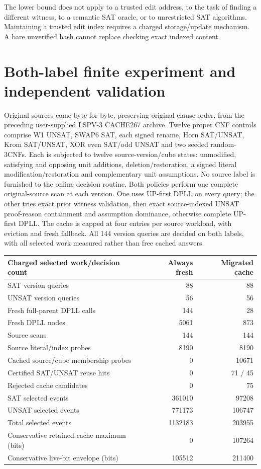 \documentclass[11pt]{article}
\begin{document}
\noindent The lower bound does not apply to a trusted edit address, to the task of finding a different witness, to a semantic SAT oracle, or to unrestricted SAT algorithms. Maintaining a trusted edit index requires a charged storage/update mechanism. A bare unverified hash cannot replace checking exact indexed content.

\section{Both-label finite experiment and independent validation}
Original sources come byte-for-byte, preserving original clause order, from the preceding user-supplied LSPV-3 CACHE267 archive. Twelve proper CNF controls comprise W1 UNSAT, SWAP6 SAT, each signed rename, Horn SAT/UNSAT, Krom SAT/UNSAT, XOR even SAT/odd UNSAT and two seeded random-3CNFs. Each is subjected to twelve source-version/cube states: unmodified, satisfying and opposing unit additions, deletion/restoration, a signed literal modification/restoration and complementary unit assumptions. No source label is furnished to the online decision routine. Both policies perform one complete original-source scan at each version. One uses UP-first DPLL on every query; the other tries exact prior witness validation, then exact source-indexed UNSAT proof-reason containment and assumption dominance, otherwise complete UP-first DPLL. The cache is capped at four entries per source workload, with eviction and fresh fallback. All 144 version queries are decided on both labels, with all selected work measured rather than free cached answers.

\begin{center}\small
\begin{tabular}{lrr}\toprule
Charged selected work/decision count & Always fresh & Migrated cache \\\midrule
SAT version queries & 88 & 88\\
UNSAT version queries & 56 & 56\\
Fresh full-parent DPLL calls & 144 & 28\\
Fresh DPLL nodes & 5061 & 873\\
Source scans & 144 & 144\\
Source literal/index probes & 8190 & 8190\\
Cached source/cube membership probes & 0 & 10671\\
Certified SAT/UNSAT reuse hits & 0 & 71 / 45\\
Rejected cache candidates & 0 & 75\\
SAT selected events & 361010 & 97208\\
UNSAT selected events & 771173 & 106747\\
Total selected events & 1132183 & 203955\\
Conservative retained-cache maximum (bits) & 0 & 107264\\
Conservative live-bit envelope (bits) & 105512 & 211400\\\bottomrule
\end{tabular}
\end{center}
\end{document}
